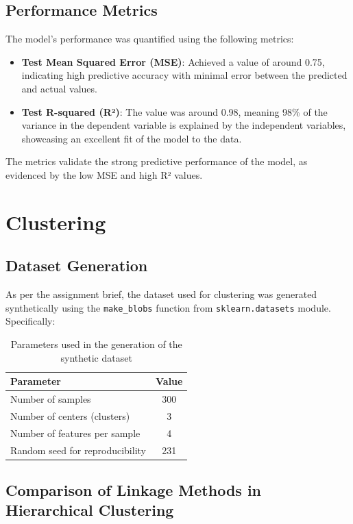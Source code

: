 \documentclass[11pt,a4paper]{article}
\begin{document}
\subsection{Performance Metrics}

The model's performance was quantified using the following metrics:

\begin{itemize}
    \item \textbf{Test Mean Squared Error (MSE)}: Achieved a value of around 0.75, indicating high predictive accuracy with minimal error between the predicted and actual values.
    \item \textbf{Test R-squared (R²)}: The value was around 0.98, meaning 98\% of the variance in the dependent variable is explained by the independent variables, showcasing an excellent fit of the model to the data.
\end{itemize}
\noindent
The metrics validate the strong predictive performance of the model, as evidenced by the low MSE and high R² values.

\section {Clustering}
\subsection*{Dataset Generation}
As per the assignment brief, the dataset used for clustering was generated synthetically using the \texttt{make\_blobs} function from \texttt{sklearn.datasets} module.
Specifically:
\begin{table}[ht]
    \centering
    \begin{tabular}{lc}
        \hline
        \textbf{Parameter}              & \textbf{Value} \\
        \hline
        Number of samples               & 300            \\
        Number of centers (clusters)    & 3              \\
        Number of features per sample   & 4              \\
        Random seed for reproducibility & 231            \\
        \hline
    \end{tabular}
    \caption{Parameters used in the generation of the synthetic dataset}
    \label{tab:dataset_params}
\end{table}

\subsection{Comparison of Linkage Methods in Hierarchical Clustering}
\end{document}
